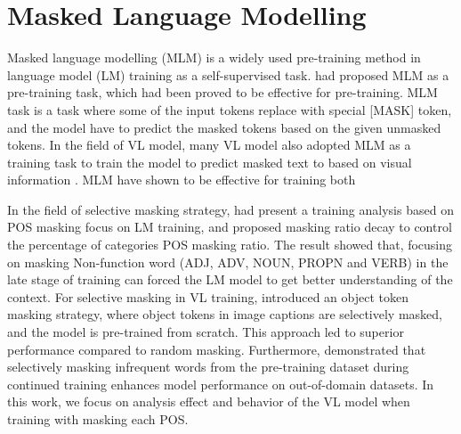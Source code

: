 \section{Masked Language Modelling}
Masked language modelling (MLM) is a widely used pre-training method in language model (LM) training \cite{bert, albert, dictbert, opt, realm} as a self-supervised task.
 had proposed MLM as a pre-training task, which had been proved to be effective for pre-training.
MLM task is a task where some of the input tokens replace with special [MASK] token, and the model have to predict the masked tokens based on the given unmasked tokens.
In the field of VL model, many VL model also adopted MLM as a training task to train the model to predict masked text to based on visual information \cite{albef, mplug, uniter, beit-3}.
MLM have shown to be effective for training both

In the field of selective masking strategy,  had present a training analysis based on POS masking focus on LM training, and proposed masking ratio decay to control the percentage of categories POS masking ratio.
The result showed that, focusing on masking Non-function word (ADJ, ADV, NOUN, PROPN and VERB) in the late stage of training can forced the LM model to get better understanding of the context. 
For selective masking in VL training,  introduced an object token masking strategy, where object tokens in image captions are selectively masked, and the model is pre-trained from scratch.
This approach led to superior performance compared to random masking.
Furthermore,  demonstrated that selectively masking infrequent words from the pre-training dataset during continued training enhances model performance on out-of-domain datasets.
In this work, we focus on analysis effect and behavior of the VL model when training with masking each POS.


